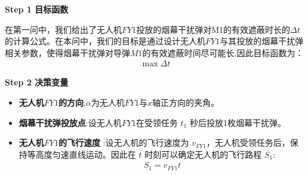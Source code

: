 \documentclass[../main.tex]{subfiles}
\begin{document}
\noindent \textbf{Step 1 目标函数}
\par 在第一问中，我们给出了无人机$FY1$投放的烟幕干扰弹对M1的有效遮蔽时长的$\Delta t$ 的计算公式。在本问中，我们的目标是通过设计无人机$FY1$与其投放的烟幕干扰弹相关参数，使得烟幕干扰弹对导弹$M1$的有效遮蔽时间尽可能长,因此目标函数为：
\begin{align}\label{10.1}
  \max \Delta t
\end{align}



\noindent \textbf{Step 2 决策变量}

\begin{itemize}
\item \textbf{无人机$FY1$的方向}:$\alpha $为无人机$FY1$与$x$轴正方向的夹角。
\item \textbf{烟幕干扰弹投放点}:设无人机$FY1$在受领任务 \( t_1 \) 秒后投放1枚烟幕干扰弹。
\item  \textbf{无人机$FY1$的飞行速度} :设无人机的飞行速度为 \( v_{FY1} \)，无人机受领任务后，保持等高度匀速直线运动。因此在 \( t \) 时刻可以确定无人机的飞行路程 \( S_1 \):
\begin{align}\label{10.2}
S_1 = v_{FY1} t
\end{align}


\end{itemize}
\end{document}
